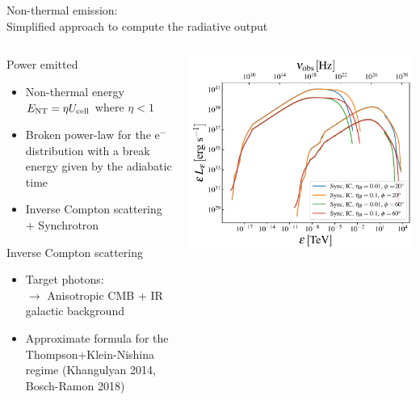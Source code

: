 \begin{frame}{Non-thermal emission:\\
	Simplified approach to compute the radiative output}
	\begin{columns}
		{\scriptsize
		\begin{column}{.5\textwidth}
			\begin{block}{Power emitted}
				\begin{itemize}
					\item Non-thermal energy $E_{\rm NT} = \eta U_{\rm cell}$ where $\eta<1$
					\item Broken power-law for the e$^{-}$ distribution with a break 
							energy given by the adiabatic time  \\
					\item Inverse Compton scattering + Synchrotron
				\end{itemize}
			\end{block}
			\begin{block}{Inverse Compton scattering}
			    \begin{itemize}
				    \item Target photons:\\
						$\rightarrow$ Anisotropic CMB + IR galactic background
					\item Approximate formula for the Thompson+Klein-Nishina regime
						(Khangulyan 2014, Bosch-Ramon 2018)
				\end{itemize}
			\end{block}
		\end{column}
		\begin{column}{.5\textwidth}
			\includegraphics[width=\linewidth]{images/eled_hr.pdf}

\end{column}}
\end{columns}
\end{frame}
